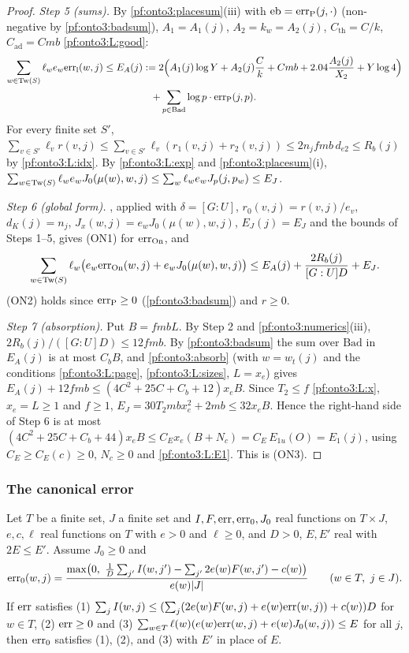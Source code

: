 \begin{proof}
\emph{Step 5 (sums).} By \cref{pf:onto3:placesum}(iii) with $\mathrm{eb}=\mathrm{err}_{\mathrm{P}}(j,\cdot)$ (non-negative
by \cref{pf:onto3:badsum}), $A_1=A_1(j)$, $A_2=k_w=A_2(j)$, $C_{\mathrm{th}}=C/k$, $C_{\mathrm{ad}}=Cmb$
\ref{pf:onto3:L:good}:
\begin{multline*}
\sum_{w\in\mathrm{Tw}(S)}\ell_we_w\mathrm{err}_{\mathrm{l}}(w,j)\le E_A(j):=2\Bigl(A_1(j)\log Y+A_2(j)\frac Ck+Cmb+
2.04\frac{A_2(j)}{X_2}+Y\log4\Bigr)\\
+\sum_{p\in\mathrm{Bad}}\log p\cdot\mathrm{err}_{\mathrm{P}}(j,p).
\end{multline*}
For every finite set $S'$, $\sum_{v\in S'}\ell_vr(v,j)\le\sum_{v\in S'}\ell_v(r_1(v,j)+r_2(v,j))\le
2n_jfmb\,d_{e2}\le R_b(j)$ by \ref{pf:onto3:L:idx}. By \ref{pf:onto3:L:exp} and \cref{pf:onto3:placesum}(i),
$\sum_{w\in\mathrm{Tw}(S)}\ell_we_wJ_0(\mu(w),w,j)\le\sum_{w}\ell_we_wJ_p(j,p_w)\le E_J$.

\emph{Step 6 (global form).} , applied with $\delta=[G:U]$, $r_0(v,j)=r(v,j)/e_v$,
$d_K(j)=n_j$, $J_x(w,j)=e_wJ_0(\mu(w),w,j)$, $E_J(j)=E_J$ and the bounds of Steps 1--5, gives (ON1) for
$\mathrm{err}_{\mathrm{On}}$, and
\[
\sum_{w\in\mathrm{Tw}(S)}\ell_w\bigl(e_w\mathrm{err}_{\mathrm{On}}(w,j)+e_wJ_0(\mu(w),w,j)\bigr)\le
E_A(j)+\frac{2R_b(j)}{[G:U]D}+E_J .
\]
(ON2) holds since $\mathrm{err}_{\mathrm{P}}\ge0$ (\cref{pf:onto3:badsum}) and $r\ge0$.

\emph{Step 7 (absorption).} Put $B=fmbL$. By Step 2 and \cref{pf:onto3:numerics}(iii),
$2R_b(j)/([G:U]D)\le12fmb$. By \cref{pf:onto3:badsum} the sum over $\mathrm{Bad}$ in $E_A(j)$ is at most $C_bB$,
and \cref{pf:onto3:absorb} (with $w=w_t(j)$ and the conditions \ref{pf:onto3:L:page}, \ref{pf:onto3:L:sizes},
$L=x_e$) gives $E_A(j)+12fmb\le(4C^2+25C+C_b+12)x_eB$. Since $T_2\le f$ \ref{pf:onto3:L:x}, $x_e=L\ge1$ and
$f\ge1$, $E_J=30T_2mbx_e^2+2mb\le32x_eB$. Hence the right-hand side of Step 6 is at most
$(4C^2+25C+C_b+44)x_eB\le C_Ex_e(B+N_c)=C_E\,E_{1u}(O)=E_1(j)$, using $C_E\ge C_E(c)\ge0$, $N_c\ge0$ and
\ref{pf:onto3:L:E1}. This is (ON3).
\end{proof}

\subsubsection{The canonical error}

\begin{lemma}\label{pf:onto3:canonical}
Let $T$ be a finite set, $J$ a finite set and $I,F,\mathrm{err},\mathrm{err}_0,J_0$ real functions on $T\times J$,
$e,c,\ell$ real functions on $T$ with $e>0$ and $\ell\ge0$, and $D>0$, $E,E'$ real with $2E\le E'$. Assume
$J_0\ge0$ and
\[
\ontothreeerr_0(w,j)=\frac{\max\bigl(0,\ \frac1D\sum_{j'}I(w,j')-\sum_{j'}2e(w)F(w,j')-c(w)\bigr)}{e(w)|J|}
\qquad(w\in T,\ j\in J).
\]
If $\mathrm{err}$ satisfies (1) $\sum_jI(w,j)\le(\sum_j(2e(w)F(w,j)+e(w)\mathrm{err}(w,j))+c(w))D$ for $w\in T$,
(2) $\mathrm{err}\ge0$ and (3) $\sum_{w\in T}\ell(w)(e(w)\mathrm{err}(w,j)+e(w)J_0(w,j))\le E$ for all $j$, then
$\mathrm{err}_0$ satisfies (1), (2), and (3) with $E'$ in place of $E$.
\end{lemma}

